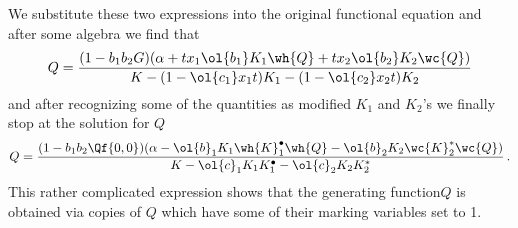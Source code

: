 We substitute these two expressions into the original functional equation and after some algebra we find that
\begin{align}
	Q = \frac{(1-b_1b_2 G)(\alpha + tx_1\ol{b_1}K_1\wh{Q}+tx_2\ol{b_2}K_2 \wc{Q})}{K-(1-\ol{c_1}x_1t)K_1-(1-\ol{c_2}x_2t)K_2}
\end{align}
and after recognizing some of the quantities as modified $K_1$ and $K_2$'s we finally stop at the solution for $Q$
\begin{align}
	Q = \frac{(1-b_1b_2 \Qf{0,0})(\alpha - \ol{b}_1 K_1 \wh{K}_1^\bullet \wh{Q}-\ol{b}_2K_2\wc{K}_2^\ast \wc{Q})}{K - \ol{c}_1 K_1 K_1^\bullet - \ol{c}_2 K_2 K_2^\ast}\,.
\end{align}
This rather complicated expression shows that the generating function$Q$ is obtained via copies of $Q$ which have some of their marking variables set to 1.
